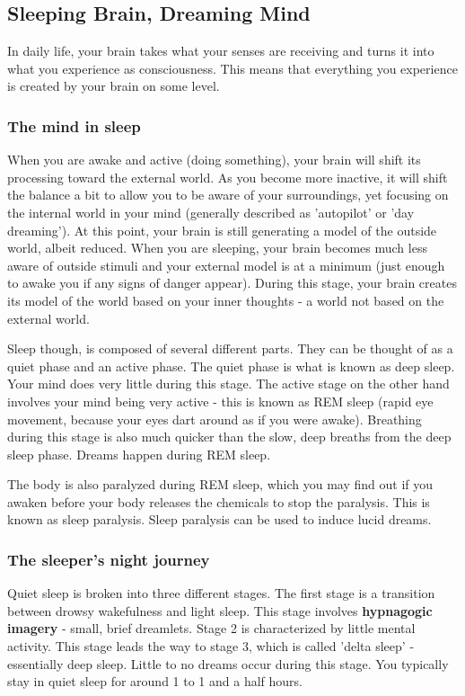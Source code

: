 \documentclass{article}
\begin{document}
\subsection{Sleeping Brain, Dreaming Mind}
In daily life, your brain takes what your senses are receiving and turns it into what you experience as consciousness. This means that everything you experience is created by your brain on some level.

\subsubsection{The mind in sleep}
When you are awake and active (doing something), your brain will shift its processing toward the external world. As you become more inactive, it will shift the balance a bit to allow you to be aware of your surroundings, yet focusing on the internal world in your mind (generally described as 'autopilot' or 'day dreaming'). At this point, your brain is still generating a model of the outside world, albeit reduced. When you are sleeping, your brain becomes much less aware of outside stimuli and your external model is at a minimum (just enough to awake you if any signs of danger appear). During this stage, your brain creates its model of the world based on your inner thoughts - a world not based on the external world.

Sleep though, is composed of several different parts. They can be thought of as a quiet phase and an active phase. The quiet phase is what is known as deep sleep. Your mind does very little during this stage. The active stage on the other hand involves your mind being very active - this is known as REM sleep (rapid eye movement, because your eyes dart around as if you were awake). Breathing during this stage is also much quicker than the slow, deep breaths from the deep sleep phase. Dreams happen during REM sleep.

The body is also paralyzed during REM sleep, which you may find out if you awaken before your body releases the chemicals to stop the paralysis. This is known as sleep paralysis. Sleep paralysis can be used to induce lucid dreams.

\subsubsection{The sleeper's night journey}
Quiet sleep is broken into three different stages. The first stage is a transition between drowsy wakefulness and light sleep. This stage involves \textbf{hypnagogic imagery} - small, brief dreamlets. Stage 2 is characterized by little mental activity. This stage leads the way to stage 3, which is called 'delta sleep' - essentially deep sleep. Little to no dreams occur during this stage. You typically stay in quiet sleep for around 1 to 1 and a half hours.
\end{document}
